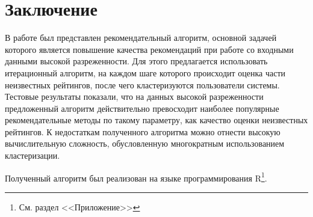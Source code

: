 \documentclass[a4paper, 12pt]{article} %
\begin{document}
\par
	

\section{Заключение}
В работе был представлен рекомендательный алгоритм, основной задачей которого является повышение качества рекомендаций при работе со входными данными высокой разреженности. Для этого предлагается использовать итерационный алгоритм, на каждом шаге которого происходит оценка части неизвестных рейтингов, после чего кластеризуются пользователи системы. Тестовые результаты показали, что на данных высокой разреженности предложенный алгоритм действительно превосходит наиболее популярные рекомендательные методы по такому параметру, как качество оценки неизвестных рейтингов.  
К недостаткам полученного алгоритма можно отнести высокую вычислительную сложность, обусловленную многократным использованием кластеризации.
\par
Полученный алгоритм был реализован на языке программирования R\footnote{См. раздел <<Приложение>>}.

\newpage
\cleardoublepage
\end{document}
